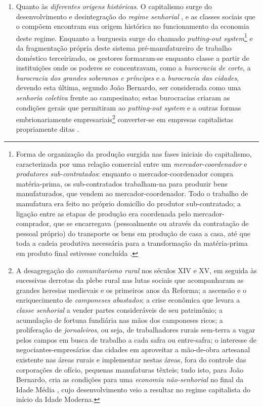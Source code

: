 \begin{enumerate}
\item Quanto às \textit{diferentes origens históricas}. O capitalismo surge do desenvolvimento e desintegração do \textit{regime senhorial} \cite{BERNARDO1995, BERNARDO1997, BERNARDO2002}, e as classes sociais que o compõem encontram sua origem histórica no funcionamento da economia deste regime.  Enquanto a burguesia surge do chamado \textit{putting-out system}\footnote{Forma de organização da produção surgida nas fases iniciais do capitalismo, caracterizada por uma relação comercial entre um \textit{mercador-coordenador} e \textit{produtores sub-contratados}: enquanto o mercador-coordenador compra matéria-prima, os sub-contratados trabalham-na para produzir bens manufaturados, que vendem ao mercador-coordenador. Todo o trabalho de manufatura era feito no próprio domicílio do produtor sub-contratado; a ligação entre as etapas de produção era coordenada pelo mercador-comprador, que se encarregava (pessoalmente ou através da contratação de pessoal próprio) do transporte os bens em produção de casa a casa, até que toda a cadeia produtiva necessária para a transformação da matéria-prima em produto final estivesse concluída \cite[p.~215-216]{WILLIAMSON1985}.} e da fragmentação própria deste sistema pré-manufatureiro de trabalho doméstico terceirizado, os gestores formaram-se enquanto classe a partir de instituições onde os poderes se concentravam, como a \textit{burocracia de corte}, a \textit{burocracia dos grandes soberanos e príncipes} e a \textit{burocracia das cidades}, devendo esta última, segundo João Bernardo, ser considerada como uma \textit{senhoria coletiva} frente ao campesinato; estas burocracias criaram as condições gerais que permitiram ao \textit{putting-out system} e a outras formas embrionariamente empresariais\footnote{A desagregação do \textit{comunitarismo rural} nos séculos XIV e XV, em seguida às sucessivas derrotas da plebe rural nas lutas sociais que acompanharam as grandes heresias medievais e os primeiros anos da Reforma; a ascensão e o enriquecimento de \textit{camponeses abastados}; a crise econômica que levara a \textit{classe senhorial} a vender partes consideráveis de seu patrimônio; a acumulação de fortuna fundiária nas mãos dos camponeses ricos; a proliferação de \textit{jornaleiros}, ou seja, de trabalhadores rurais sem-terra a vagar pelos campos em busca de trabalho a cada safra ou entre-safra; o interesse de negociantes-empresários das cidades em aproveitar a mão-de-obra artesanal existente nas áreas rurais e implementar nestas áreas, fora do controle das corporações de ofício, pequenas manufaturas têxteis; tudo isto, para João Bernardo, cria as condições para uma \textit{economia não-senhorial} no final da Idade Média \cite[p.~579-623]{BERNARDO2002}, cujo desenvolvimento veio a resultar no regime capitalista do início da Idade Moderna.} converter-se em empresas capitalistas propriamente ditas \cite[p.~208]{BERNARDO1991}. 

\end{enumerate}
